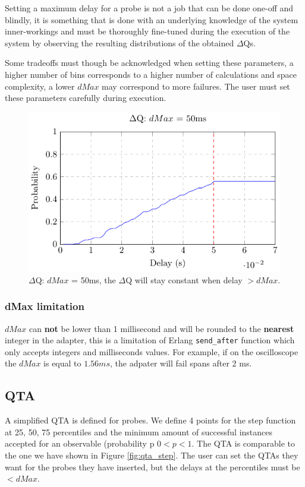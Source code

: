     Setting a maximum delay for a probe is not a job that can be done one-off and blindly, it is something that is done with an underlying knowledge of the system inner-workings and must be thoroughly fine-tuned during the execution of the system by observing the resulting distributions of the obtained $\Delta$Qs. 

    Some tradeoffs must though be acknowledged when setting these parameters, a higher number of bins corresponds to a higher number of calculations and space complexity, a lower $dMax$ may correspond to more failures. The user must set these parameters carefully during execution.

    \begin{figure}[H]
        \begin{center}
            \includegraphics[scale = 1]{tikz/cdf_dmax.pdf}
        \end{center}
        \caption{$\Delta$Q: $dMax$ = 50ms, the $\Delta$Q will stay constant when delay $> dMax$.}
    \end{figure}

    \subsubsection{dMax limitation}
        $dMax$ can \textbf{not} be lower than 1 millisecond and will be rounded to the \textbf{nearest} integer in the adapter, this is a limitation of Erlang \texttt{send\_after} function which only accepts integers and milliseconds values. For example, if on the oscilloscope the $dMax$ is equal to $1.56 ms$, the adpater will fail spans after 2 ms.

    \subsection{QTA}
        A simplified QTA is defined for probes. We define 4 points for the step function at 25, 50, 75 percentiles and the minimum amount of successful instances accepted for an observable (probability p $0 < p < 1$. The QTA is comparable to the one we have shown in Figure \cref{fig:qta_step}. The user can set the QTAs they want for the probes they have inserted, but the delays at the percentiles must be $< dMax$.

